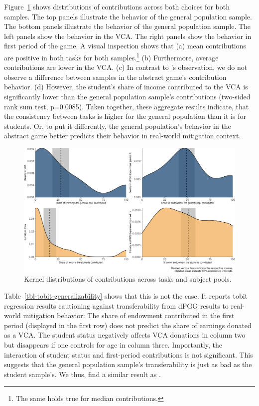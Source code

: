 \documentclass[
  authoryear,
  preprint,
  3p]{elsarticle}
\begin{document}
Figure~\ref{fig-kernel-generalizability} shows distributions of
contributions across both choices for both samples. The top panels
illustrate the behavior of the general population sample. The bottom
panels illustrate the behavior of the general population sample. The
left panels show the behavior in the VCA. The right panels show the
behavior in first period of the game. A visual inspection shows that (a)
mean contributions are positive in both tasks for both
samples.\footnote{The same holds true for median contributions.} (b)
Furthermore, average contributions are lower in the VCA. (c) In contrast
to \citet{GKLS2020}'s observation, we do not observe a difference
between samples in the abstract game's contribution behavior. (d)
However, the student's share of income contributed to the VCA is
significantly lower than the general population sample's contributions
(two-sided rank sum test, p=0.0085). Taken together, these aggregate
results indicate, that the consistency between tasks is higher for the
general population than it is for students. Or, to put it differently,
the general population's behavior in the abstract game better predicts
their behavior in real-world mitigation context.

\begin{figure}

{\centering \includegraphics{paper_files/figure-pdf/fig-kernel-generalizability-1.pdf}

}

\caption{\label{fig-kernel-generalizability}Kernel distributions of
contributions across tasks and subject pools.}

\end{figure}

Table~\ref{tbl-tobit-generalizability} shows that this is not the case.
It reports tobit regression results cautioning against transferability
from dPGG results to real-world mitigation behavior: The share of
endowment contributed in the first period (displayed in the first row)
does not predict the share of earnings donated as a VCA. The student
status negatively affects VCA donations in column two but disappears if
one controls for age in column three. Importantly, the interaction of
student status and first-period contributions is not significant. This
suggests that the general population sample's transferability is just as
bad as the student sample's. We thus, find a similar result as
\citet[p.6]{GKLS2020}.
\end{document}
